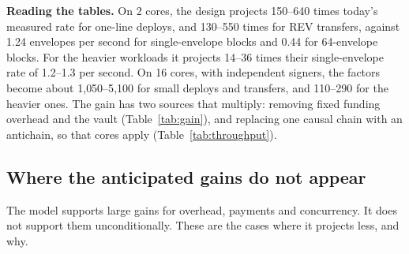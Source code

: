 \documentclass[11pt]{article}
\begin{document}
\textbf{Reading the tables.} On 2 cores, the design projects 150--640 times today's measured rate for one-line deploys, and 130--550 times for REV transfers, against 1.24 envelopes per second for single-envelope blocks and 0.44 for 64-envelope blocks. For the heavier workloads it projects 14--36 times their single-envelope rate of 1.2--1.3 per second. On 16 cores, with independent signers, the factors become about 1{,}050--5{,}100 for small deploys and transfers, and 110--290 for the heavier ones. The gain has two sources that multiply: removing fixed funding overhead and the vault (Table~\ref{tab:gain}), and replacing one causal chain with an antichain, so that cores apply (Table~\ref{tab:throughput}).

\subsection{Where the anticipated gains do not appear}\label{sec:limits}

The model supports large gains for overhead, payments and concurrency. It does not support them unconditionally. These are the cases where it projects less, and why.
\end{document}
